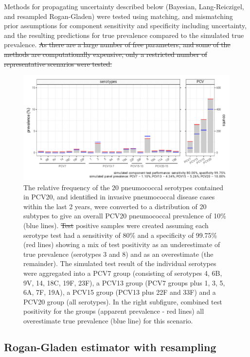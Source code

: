 \documentclass[a4paper, 12pt, twoside]{article}
\let\Oldsubsection\subsection
\renewcommand{\subsection}{\FloatBarrier\Oldsubsection}
\providecommand{\DIFaddtex}[1]{{\protect\color{blue}\uwave{#1}}} %
\providecommand{\DIFdeltex}[1]{{\protect\color{red}\sout{#1}}}                      %
\providecommand{\DIFdelbegin}{} %
\providecommand{\DIFdelend}{} %
\providecommand{\DIFaddFL}[1]{\DIFadd{#1}} %
\providecommand{\DIFdelFL}[1]{\DIFdel{#1}} %
\providecommand{\DIFaddbeginFL}{} %
\providecommand{\DIFaddendFL}{} %
\providecommand{\DIFdelbeginFL}{} %
\providecommand{\DIFdelendFL}{} %
\providecommand{\DIFadd}[1]{\texorpdfstring{\DIFaddtex{#1}}{#1}} %
\providecommand{\DIFdel}[1]{\texorpdfstring{\DIFdeltex{#1}}{}} %
\begin{document}
Methods for propagating uncertainty described below (Bayesian, Lang-Reiczigel, and resampled Rogan-Gladen) were tested using matching, and mismatching prior assumptions for component sensitivity and specificity including uncertainty, and the resulting predictions for true prevalence compared to the simulated true prevalence.
\DIFdelbegin \DIFdel{As there are a large number of free parameters, and some of the methods are computationally expensive, only a restricted number of representative scenarios were tested.
}\DIFdelend 

\begin{figure}[h!]
\centering
  \includegraphics{fig/simulation_setup_prev_10_v2}
  \caption{The relative frequency of the 20 pneumococcal serotypes contained in PCV20, and identified in invasive pneumococcal disease cases within the last 2 years, were converted to a distribution of 20 subtypes to give an overall PCV20 pneumococcal prevalence of 10\% (blue lines). \DIFdelbeginFL \DIFdelFL{Test }\DIFdelendFL \DIFaddbeginFL \DIFaddFL{In a simulation of size 4000, test }\DIFaddendFL positive samples were created assuming each serotype test had a sensitivity of 80\% and a specificity of 99.75\% (red lines) showing a mix of test positivity as an underestimate of true prevalence (serotypes 3 and 8) and as an overestimate (the remainder). The simulated test result of the individual serotypes were aggregated into a PCV7 group (consisting of serotypes 4, 6B, 9V, 14, 18C, 19F, 23F), a PCV13 group (PCV7 groups plus 1, 3, 5, 6A, 7F, 19A), a PCV15 group (PCV13 plus 22F and 33F) and a PCV20 group (all serotypes). In the right subfigure, combined test positivity for the groups (apparent prevalence - red lines) all overestimate true prevalence (blue line) for this scenario.}
\label{fig:B2}
\end{figure}

\subsection{Rogan-Gladen estimator with resampling}
\end{document}
